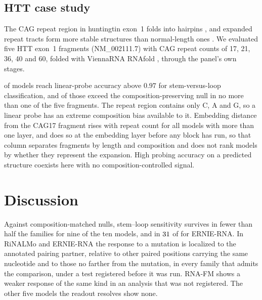 \documentclass[11pt]{article}
\begin{document}
\subsection{HTT case study}
\label{sec:htt-results}

The CAG repeat region in huntingtin exon~1 folds into hairpins
\citep{demezer2011mutant}, and expanded repeat tracts form more stable
structures than normal-length ones \citep{krzyzosiak2012triplet}. We evaluated
five HTT exon~1 fragments (NM\_002111.7) with CAG repeat counts of 17, 21, 36,
40 and 60, folded with ViennaRNA RNAfold \citep{lorenz2011viennarna}, through
the panel's own stages.



\httHighProbing{} of \httModels{} models reach linear-probe accuracy above
$0.97$ for stem-versus-loop classification, and \httHighProbingClean{} of those
exceed the composition-preserving null in no more than one of the five
fragments. The repeat region contains only C, A and G, so a linear probe has an
extreme composition bias available to it. Embedding distance from the CAG17
fragment rises with repeat count for all \httMonotone{} models with more than
one layer, and does so at the embedding layer before any block has run, so that
column separates fragments by length and composition and does not rank models
by whether they represent the expansion. High probing accuracy on a predicted
structure coexists here with no composition-controlled signal.


\section{Discussion}
\label{sec:discussion}

Against composition-matched nulls, stem--loop sensitivity survives in fewer
than half the families for nine of the ten models, and in $31{}$ of
\panelN{} for ERNIE-RNA. In RiNALMo and ERNIE-RNA the response to a
mutation is localized to the annotated pairing partner, relative to other
paired positions carrying the same nucleotide and to those no farther from the
mutation, in every family that admits the comparison, under a test registered
before it was run. RNA-FM shows a weaker response of the same kind in an
analysis that was not registered. The other five models the readout resolves
show none.
\end{document}
